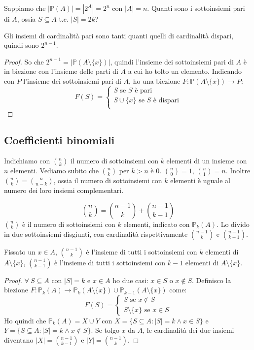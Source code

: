 \begin{prop}
Sappiamo che $|\mathbb{P}(A)| = |2^A| = 2^n$ con $|A| = n$. Quanti sono i sottoinsiemi pari di $A$, ossia $S \subseteq A $ t.c. $|S| = 2k$?

Gli insiemi di cardinalit\`a pari sono tanti quanti quelli di cardinalit\`a dispari, quindi sono $2^{n-1}$.
\end{prop}
\begin{proof}
So che $2^{n-1} = |\mathbb{P}(A \setminus \{x\})|$, quindi l'insieme dei sottoinsiemi pari di $A$ \`e in biezione con l'insieme delle parti di $A$ a cui ho tolto un elemento. Indicando con $P$ l'insieme dei sottoinsiemi pari di $A$, ho una biezione $F : \mathbb{P}(A \setminus \{x\}) \to P$:
\[
F(S) = 
\begin{cases}
S \text{ se } S \text{ \`e pari} \\
S \cup \{ x \} \text{ se } S \text{ \`e dispari} \\
\end{cases}
\]
\end{proof}

\subsection{Coefficienti  binomiali}
Indichiamo con $\binom{n}{k}$ il numero di sottoinsiemi con $k$ elementi di un insieme con $n$ elementi. Vediamo subito che $\binom{n}{k}$ per $k > n$ \`e 0. $\binom{n}{0} = 1$, $\binom{n}{1} = n$. Inoltre $\binom{n}{k} = \binom{n}{n-k}$, ossia il numero di sottoinsiemi con $k$ elementi \`e uguale al numero dei loro insiemi complementari.
\begin{prop}
\begin{equation}
\binom{n}{k} = \binom{n-1}{k} + \binom{n-1}{k-1}
\end{equation}
$\binom{n}{k}$ \`e il numero di sottoinsiemi con $k$ elementi, indicato con $\mathbb{P}_{k}(A)$. Lo divido in due sottoinsiemi disgiunti, con cardinalit\`a rispettivamente $\binom{n-1}{k}$ e $\binom{n-1}{k-1}$.

Fissato un $x \in A$, $\binom{n-1}{k}$ \`e l'insieme di tutti i sottoinsiemi con $k$ elementi di $A \setminus \{ x \}$, $\binom{n-1}{k-1}$ \`e l'insieme di tutti i sottoinsiemi con $k - 1$ elementi di $A \setminus \{x \}$.
\end{prop}
\begin{proof}
$\forall \ S \subseteq A$ con $|S| = k$ e $x \in A$ ho due casi: $x \in S$ o $x \notin S$. Definisco la biezione $F : \mathbb{P}_k (A) \to \mathbb{P}_k (A \setminus \{ x \}) \cup \mathbb{P}_{k - 1} (A \setminus \{ x \})$ come:
\[
F (S) =
\begin{cases}
S \text{ se } x \notin S \\
S \setminus \{ x \} \text{ se } x \in S
\end{cases}
\]
Ho quindi che $\mathbb{P}_k (A) = X \cup Y$ con $X = \{ S \subseteq A : |S| = k \land x \in S \}$ e $Y = \{ S \subseteq A : |S| = k \land x \notin S\}$. Se tolgo $x$ da $A$, le cardinalit\`a dei due insiemi diventano $|X| = \binom{n - 1}{k - 1}$ e $|Y| = \binom{n - 1}{k}$.
\end{proof}

